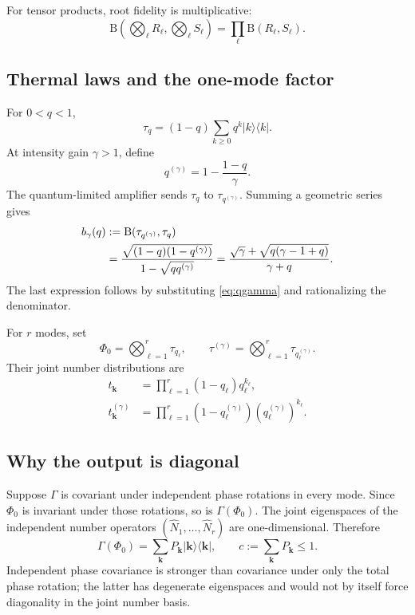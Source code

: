 \documentclass[11pt]{article}
\newcommand{\B}{\mathrm B}
\newcommand{\ketbra}[1]{\lvert #1\rangle\!\langle #1\rvert}
\begin{document}
For tensor products, root fidelity is multiplicative:
\begin{equation}\label{eq:multiplicative}
  \B\!\left(\bigotimes_\ell R_\ell,
             \bigotimes_\ell S_\ell\right)
  =\prod_\ell\B(R_\ell,S_\ell).
\end{equation}

\subsection{Thermal laws and the one-mode factor}

For $0<q<1$,
\[
  \tau_q=(1-q)\sum_{k\geq0}q^k\ketbra{k}.
\]
At intensity gain $\gamma>1$, define
\begin{equation}\label{eq:qgamma}
  q^{(\gamma)}=1-\frac{1-q}{\gamma}.
\end{equation}
The quantum-limited amplifier sends $\tau_q$ to
$\tau_{q^{(\gamma)}}$.  Summing a geometric series gives
\begin{align}
  b_\gamma(q)
  &:=\B(\tau_{q^{(\gamma)}},\tau_q)\notag\\
  &=\frac{\sqrt{(1-q)(1-q^{(\gamma)})}}
          {1-\sqrt{q q^{(\gamma)}}}
   =\frac{\sqrt\gamma+\sqrt{q(\gamma-1+q)}}{\gamma+q}.
  \label{eq:bgamma}
\end{align}
The last expression follows by substituting \eqref{eq:qgamma} and
rationalizing the denominator.

For $r$ modes, set
\begin{equation}\label{eq:product-states}
  \Phi_0=\bigotimes_{\ell=1}^r\tau_{q_\ell},
  \qquad
  \tau^{(\gamma)}
  =\bigotimes_{\ell=1}^r\tau_{q_\ell^{(\gamma)}}.
\end{equation}
Their joint number distributions are
\begin{align}
  t_{\mathbf k}
  &=\prod_{\ell=1}^r(1-q_\ell)q_\ell^{k_\ell},
  \label{eq:t}\\
  t_{\mathbf k}^{(\gamma)}
  &=\prod_{\ell=1}^r
      (1-q_\ell^{(\gamma)})(q_\ell^{(\gamma)})^{k_\ell}.
  \label{eq:tgamma}
\end{align}

\subsection{Why the output is diagonal}

Suppose $\Gamma$ is covariant under independent phase rotations in every
mode.  Since $\Phi_0$ is invariant under those rotations, so is
$\Gamma(\Phi_0)$.  The joint eigenspaces of the independent number operators
$(\widehat N_1,\ldots,\widehat N_r)$ are one-dimensional.  Therefore
\begin{equation}\label{eq:P-output}
  \Gamma(\Phi_0)
  =\sum_{\mathbf k}P_{\mathbf k}\ketbra{\mathbf k},
  \qquad
  c:=\sum_{\mathbf k}P_{\mathbf k}\leq1.
\end{equation}
Independent phase covariance is stronger than covariance under only the
total phase rotation; the latter has degenerate eigenspaces and would not by
itself force diagonality in the joint number basis.
\end{document}
